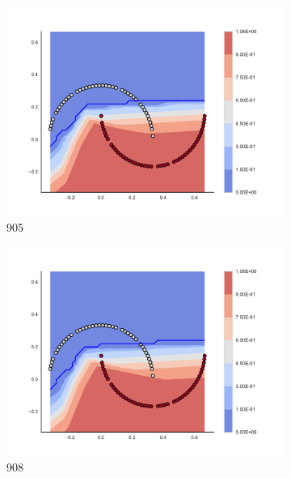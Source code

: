 \begin{figure}[h]
\begin{subfigure}[b]{0.09\textwidth}
    \includegraphics[clip, trim=2.35cm 1.75cm 4.5cm 0cm,width=\textwidth]{img/convergence/905.pdf}
    \caption{905}
    \label{fig:convergence_905}
\end{subfigure}
%
\begin{subfigure}[b]{0.09\textwidth}
    \includegraphics[clip, trim=2.35cm 1.75cm 4.5cm 0cm,width=\textwidth]{img/convergence/908.pdf}
    \caption{908}
    \label{fig:convergence_908}
\end{subfigure}
%
\begin{subfigure}[b]{0.09\textwidth}

\end{subfigure}
\end{figure}
